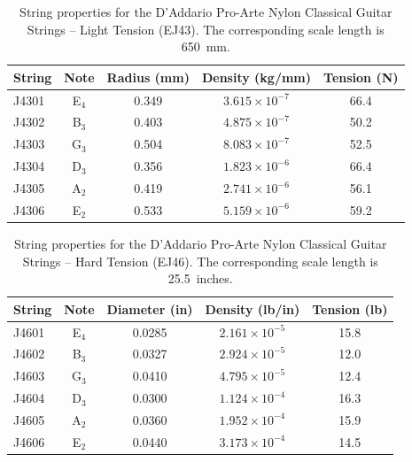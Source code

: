 \begin{table}[htbp]
  \centering
  \caption{\label{tbl:ej43_mks} String properties for the D'Addario Pro-Arte Nylon Classical Guitar Strings -- Light Tension (EJ43). The corresponding scale length is 650~mm.}
    \begin{tabular}{lcccc}
    \hline \hline
    String  & Note  & \multicolumn{1}{l}{Radius (mm)} & \multicolumn{1}{l}{Density (kg/mm)} & \multicolumn{1}{l}{Tension (N)} \\
    \hline
    J4301 & E$_4$  & 0.349 & $3.615 \times 10^{-7}$ & 66.4 \\
    J4302 & B$_3$  & 0.403 & $4.875 \times 10^{-7}$ & 50.2 \\
    J4303 & G$_3$  & 0.504 & $8.083 \times 10^{-7}$ & 52.5 \\
    J4304 & D$_3$  & 0.356 & $1.823 \times 10^{-6}$ & 66.4 \\
    J4305 & A$_2$  & 0.419 & $2.741 \times 10^{-6}$ & 56.1 \\
    J4306 & E$_2$  & 0.533 & $5.159 \times 10^{-6}$ & 59.2 \\
    \hline
    \end{tabular}%
  \label{tab:addlabel}%
\end{table}%

\begin{table}[htbp]
  \centering
  \caption{\label{tbl:ej46_ips} String properties for the D'Addario Pro-Arte Nylon Classical Guitar Strings -- Hard Tension (EJ46). The corresponding scale length is 25.5~inches.}
    \begin{tabular}{lcccc}
    \hline \hline
    String  & Note  & \multicolumn{1}{l}{Diameter (in)} & \multicolumn{1}{l}{Density (lb/in)} & \multicolumn{1}{l}{Tension (lb)} \\
    \hline
    J4601 & E$_4$  & 0.0285 & $2.161 \times 10^{-5}$ & 15.8 \\
    J4602 & B$_3$  & 0.0327 & $2.924 \times 10^{-5}$ & 12.0 \\
    J4603 & G$_3$  & 0.0410 & $4.795 \times 10^{-5}$ & 12.4 \\
    J4604 & D$_3$  & 0.0300 & $1.124 \times 10^{-4}$ & 16.3 \\
    J4605 & A$_2$  & 0.0360 & $1.952 \times 10^{-4}$ & 15.9 \\
    J4606 & E$_2$  & 0.0440 & $3.173 \times 10^{-4}$ & 14.5 \\
    \hline
    \end{tabular}%
  \label{tab:addlabel}%
\end{table}%

